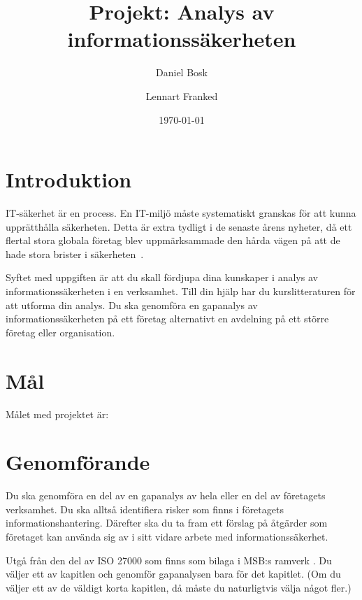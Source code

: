 \documentclass[a4paper]{llncs}
\begin{document}
\title{Projekt: Analys av informationssäkerheten}
\author{%
  Daniel Bosk
  \and
  Lennart Franked
}
\date{\today}

\maketitle

\section{Introduktion}

IT-säkerhet är en process.
En IT-miljö måste systematiskt granskas för att kunna upprätthålla säkerheten.
Detta är extra tydligt i de senaste årens nyheter, då ett flertal stora globala 
företag blev uppmärksammade den hårda vägen på att de hade stora brister 
i säkerheten~\cite[se][]{Fisher2011rsa,Hunt2011abs,Cluley2012twp,%
  Oberheide2010bao,Cubrilovic2009rhf,%
  Jones2013targethack,Ducklin2014targethack,Zetter2014targethack%
}.

Syftet med uppgiften är att du skall fördjupa dina kunskaper i analys av 
informationssäkerheten i en verksamhet.
Till din hjälp har du kurslitteraturen för att utforma din analys.
Du ska genomföra en gapanalys av informationssäkerheten på ett företag 
alternativt en avdelning på ett större företag eller organisation.


\section{Mål}

Målet med projektet är:
\begin{itemize}
	
\end{itemize}


\section{Genomförande}
\noindent
Du ska genomföra en del av en gapanalys av hela eller en del av företagets 
verksamhet.
Du ska alltså identifiera risker som finns i företagets informationshantering.
Därefter ska du ta fram ett förslag på åtgärder som företaget kan använda sig 
av i sitt vidare arbete med informationssäkerhet.

Utgå från den del av ISO 27000 som finns som bilaga i MSB:s ramverk 
\cite{MSB2011gb}.
Du väljer ett av kapitlen och genomför gapanalysen bara för det kapitlet.
(Om du väljer ett av de väldigt korta kapitlen, då måste du naturligtvis välja 
något fler.)
\end{document}
